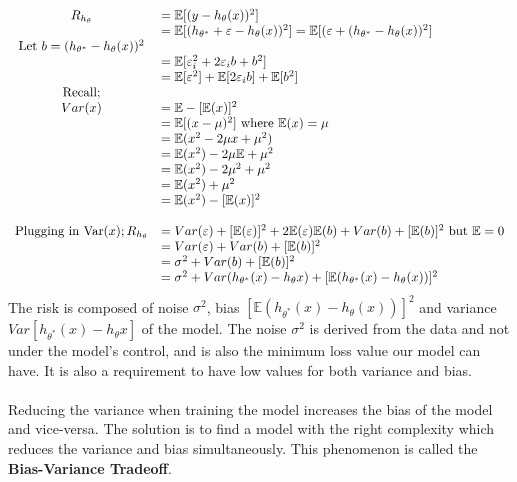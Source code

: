 \documentclass[12pt,a4paper,titlepage,portrait,openany]{book}
\begin{document}
	\begin{equation}
	\begin{array}{cl}
		R_{h_\theta} &= \mathbb{E}[(y-h_\theta(x))^2] \\
		&= \mathbb{E}[(h_{\theta^*} + \varepsilon -h_{\theta}(x))^2] =
		\mathbb{E}[(\varepsilon + (h_{\theta^*}  -h_{\theta}(x))^2] \\
		\text{Let}~b = (h_{\theta^*}  -h_{\theta}(x))^2 \\
		&= \mathbb{E}[\varepsilon_i^2 + 2\varepsilon_i{b} + b^2] \\
		&= \mathbb{E}[\varepsilon^2] + \mathbb{E}[2\varepsilon_i{b}] + \mathbb{E}[b^2] \\
		\linebreak
		\text{Recall;} \\
		Var(x) &= \mathbb{E} - [\mathbb{E}(x)]^2 \\
		&= \mathbb{E}[(x - \mu)^2] ~ \text{where} ~ \mathbb{E}(x) = \mu \\
		&= \mathbb{E}(x^2 -2\mu{x}+\mu^2) \\
		&= \mathbb{E}(x^2)-2\mu\mathbb{E} + \mu^2 \\
		&= \mathbb{E}(x^2)-2\mu^2 + \mu^2 \\
		&= \mathbb{E}(x^2) + \mu^2 \\
		&= \mathbb{E}(x^2)-[\mathbb{E}(x)]^2 \\\\
		\text{Plugging in Var}(x);
		R_{h_\theta} &= Var(\varepsilon) + [\mathbb{E}(\varepsilon)]^2 + 2\mathbb{E}(\varepsilon)\mathbb{E}(b) + Var(b) + [\mathbb{E}(b)]^2~\text{but}~\mathbb{E} = 0 \\
		&= Var(\varepsilon) + Var(b) + [\mathbb{E}(b)]^2 \\
		&= \sigma^2 + Var(b) + [\mathbb{E}(b)]^2 \\
		&= \sigma^2 + Var(h_{\theta^*}(x) - h_\theta{x}) + [\mathbb{E}(h_{\theta^*}(x) - h_\theta(x))]^2
				
	\end{array}
	\end{equation}
	The risk is composed of noise $\sigma^2$, bias
	$[\mathbb{E}(h_{\theta^*}(x) - h_\theta(x))]^2$ and variance $Var[h_{\theta^*}(x) - h_\theta{x}]$ of the model. The noise $\sigma^2$ is derived from the data and not under the model's control, and is also the minimum loss value our model can have. It is also a requirement to have low values for both variance and bias. \\\\
	Reducing the variance when training the model increases the bias of the model and vice-versa. The solution is to find a model with the right complexity which reduces the variance and bias simultaneously. This phenomenon is called the \textbf{Bias-Variance Tradeoff}.
	
\end{document}
